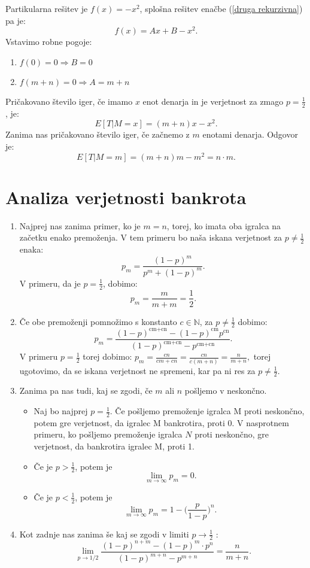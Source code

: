 \documentclass[12pt, a4paper]{article}
\begin{document}
Partikularna rešitev je $f(x)=-x^2$, splošna rešitev enačbe (\ref{druga rekurzivna}) pa je: $$f(x)=Ax+B-x^2.$$
Vstavimo robne pogoje:
\begin{enumerate}
\item $f(0)=0\Rightarrow B = 0$
\item $f(m+n)=0 \Rightarrow A = m+n$
\end{enumerate}
Pričakovano število iger, če imamo $x$ enot denarja in je verjetnost za zmago $p=\frac{1}{2}$, je: $$E[T|M=x]= (m+n)x-x^2.$$
Zanima nas pričakovano število iger, če začnemo z $m$ enotami denarja. Odgovor je:$$E[T|M=m]=(m+n)m-m^2= n\cdot m.$$

\newpage

\section{Analiza verjetnosti bankrota}

\begin{enumerate}
\item Najprej nas zanima primer, ko je $m = n$, torej, ko imata oba igralca na začetku enako premoženja. V tem primeru bo naša iskana verjetnost za $p \neq \frac{1}{2}$ enaka: 
$$p_m = \frac{(1-p)^m}{p^m+(1-p)^m}.$$
V primeru, da je $p = \frac{1}{2}$, dobimo: 
$$p_m = \frac{m}{m + m} = \frac{1}{2}.$$

\item Če obe premoženji pomnožimo s konstanto $c \in  \mathbb{N}$, za $p \neq \frac{1}{2}$ dobimo:
$$p_m = \frac{(1-p)^{\text{cm}+\text{cn}}-(1-p)^{\text{cm}} p^{\text{cn}}}{(1-p)^{\text{cm}+\text{cn}}-p^{\text{cm}+\text{cn}}}.$$
V primeru $p = \frac{1}{2}$ torej dobimo: 
$p_m = \frac{cn}{cm + cn} = \frac{cn}{c(m + n)} = \frac{n}{m + n},$ torej ugotovimo, da se iskana verjetnost ne spremeni, kar pa ni res za $p \neq \frac{1}{2}$.

\item Zanima pa nas tudi, kaj se zgodi, če $m$ ali $n$ pošljemo v neskončno. 
\begin{itemize}
\item Naj bo najprej $p = \frac{1}{2}$. Če pošljemo premoženje igralca M proti neskončno, potem gre verjetnost, da igralec M bankrotira, proti 0. V nasprotnem primeru, ko pošljemo premoženje igralca $N$ proti neskončno, gre verjetnost, da bankrotira igralec M, proti 1.
\item Če je $p > \frac{1}{2}$, potem je 
$$\lim_{m \to \infty} p_m = 0.$$
\item Če je $p < \frac{1}{2}$, potem je 
$$\lim_{m \to \infty} p_m = 1 - \Big(\frac{p}{1-p}\Big)^n.$$
\end{itemize}

\item Kot zadnje nas zanima še kaj se zgodi v limiti $ p \to \frac{1}{2}$ :
$$ \lim_{p \to 1/2}  \frac{(1-p)^{n+m} - (1-p)^m \cdot p^n}{(1-p)^{m+n} - p^{m+n}}  =\frac{n}{m + n}.$$

\end{enumerate}
\end{document}
